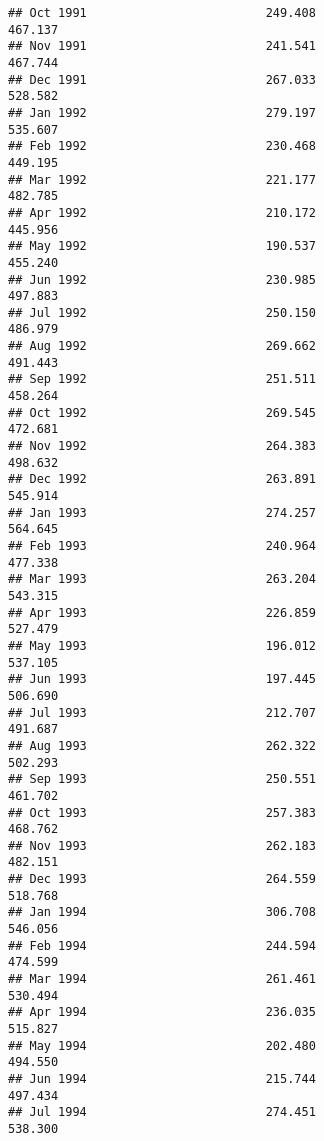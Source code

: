 \documentclass[
]{article}
\begin{document}
\begin{verbatim}
## Oct 1991                         249.408                           467.137
## Nov 1991                         241.541                           467.744
## Dec 1991                         267.033                           528.582
## Jan 1992                         279.197                           535.607
## Feb 1992                         230.468                           449.195
## Mar 1992                         221.177                           482.785
## Apr 1992                         210.172                           445.956
## May 1992                         190.537                           455.240
## Jun 1992                         230.985                           497.883
## Jul 1992                         250.150                           486.979
## Aug 1992                         269.662                           491.443
## Sep 1992                         251.511                           458.264
## Oct 1992                         269.545                           472.681
## Nov 1992                         264.383                           498.632
## Dec 1992                         263.891                           545.914
## Jan 1993                         274.257                           564.645
## Feb 1993                         240.964                           477.338
## Mar 1993                         263.204                           543.315
## Apr 1993                         226.859                           527.479
## May 1993                         196.012                           537.105
## Jun 1993                         197.445                           506.690
## Jul 1993                         212.707                           491.687
## Aug 1993                         262.322                           502.293
## Sep 1993                         250.551                           461.702
## Oct 1993                         257.383                           468.762
## Nov 1993                         262.183                           482.151
## Dec 1993                         264.559                           518.768
## Jan 1994                         306.708                           546.056
## Feb 1994                         244.594                           474.599
## Mar 1994                         261.461                           530.494
## Apr 1994                         236.035                           515.827
## May 1994                         202.480                           494.550
## Jun 1994                         215.744                           497.434
## Jul 1994                         274.451                           538.300

\end{verbatim}
\end{document}
